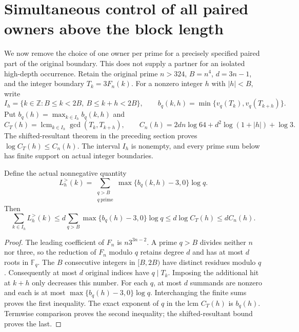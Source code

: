 \section{Simultaneous control of all paired owners above the block length}
\label{apx-section}

We now remove the choice of one owner per prime for a precisely specified
paired part of the original boundary. This does not supply a partner for
an isolated high-depth occurrence. Retain the original prime \(n>324\),
\(B=n^4\), \(d=3n-1\), and the integer boundary \(T_k=3F_n(k)\).
For a nonzero integer \(h\) with \(|h|<B\), write
\[
 I_h=\{k\in\mathbb Z:B\le k<2B,\ B\le k+h<2B\},\qquad
 b_q(k,h)=\min\{v_q(T_k),v_q(T_{k+h})\}.
\]
Put \(b_q(h)=\max_{k\in I_h}b_q(k,h)\) and
\begin{equation}
 C_T(h)=\mathop{\mathrm{lcm}}_{k\in I_h}\gcd(T_k,T_{k+h}),\qquad
 C_n(h)=2dn\log64+d^2\log(1+|h|)+\log3.
 \label{apx-constants}
\end{equation}
The shifted-resultant theorem in the preceding section proves
\(\log C_T(h)\le C_n(h)\). The interval \(I_h\) is nonempty,
and every prime sum below has finite support on actual integer boundaries.

\begin{theorem}
\label{apx-all-owners}
Define the actual nonnegative quantity
\[
 L_h^{>}(k)=\sum_{\substack{q>B\\q\ \mathrm{prime}}}
                 \max\{b_q(k,h)-3,0\}\log q .
\]
Then
\begin{equation}
 \sum_{k\in I_h}L_h^{>}(k)
 \le d\sum_{q>B}\max\{b_q(h)-3,0\}\log q
 \le d\log C_T(h)\le dC_n(h).
 \label{apx-total}
\end{equation}
\end{theorem}
\begin{proof}
The leading coefficient of \(F_n\) is \(n3^{3n-2}\).
A prime \(q>B\) divides neither \(n\) nor three, so the reduction
of \(F_n\) modulo \(q\) retains degree \(d\) and has at most
\(d\) roots in \(\mathbb F_q\). The \(B\) consecutive integers
in \([B,2B)\) have distinct residues modulo \(q\). Consequently
at most \(d\) original indices have \(q\mid T_k\).
Imposing the additional hit at \(k+h\) only decreases this number.
For each \(q\), at most \(d\) summands are nonzero and each is
at most \(\max\{b_q(h)-3,0\}\log q\). Interchanging the finite
sums proves the first inequality. The exact exponent of \(q\) in
the lcm \(C_T(h)\) is \(b_q(h)\). Termwise comparison proves
the second inequality; the shifted-resultant bound proves the last.
\end{proof}

